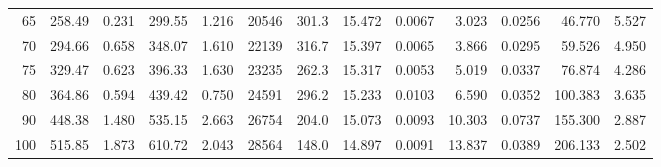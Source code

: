 \documentclass[10pt]{article}
\begin{document}
{\begin{tabular}{|r|rr|rr|rr|rr|rr|r|r|}
       65 &       258.49 &        0.231 &       299.55 &        1.216 &        20546 &        301.3 &       15.472 &       0.0067 &        3.023 &       0.0256 &       46.770 &        5.527 \\
       70 &       294.66 &        0.658 &       348.07 &        1.610 &        22139 &        316.7 &       15.397 &       0.0065 &        3.866 &       0.0295 &       59.526 &        4.950 \\
       75 &       329.47 &        0.623 &       396.33 &        1.630 &        23235 &        262.3 &       15.317 &       0.0053 &        5.019 &       0.0337 &       76.874 &        4.286 \\
       80 &       364.86 &        0.594 &       439.42 &        0.750 &        24591 &        296.2 &       15.233 &       0.0103 &        6.590 &       0.0352 &      100.383 &        3.635 \\
       90 &       448.38 &        1.480 &       535.15 &        2.663 &        26754 &        204.0 &       15.073 &       0.0093 &       10.303 &       0.0737 &      155.300 &        2.887 \\
      100 &       515.85 &        1.873 &       610.72 &        2.043 &        28564 &        148.0 &       14.897 &       0.0091 &       13.837 &       0.0389 &      206.133 &        2.502 \\
\hline
\end{tabular}
}







\pagebreak
\end{document}
